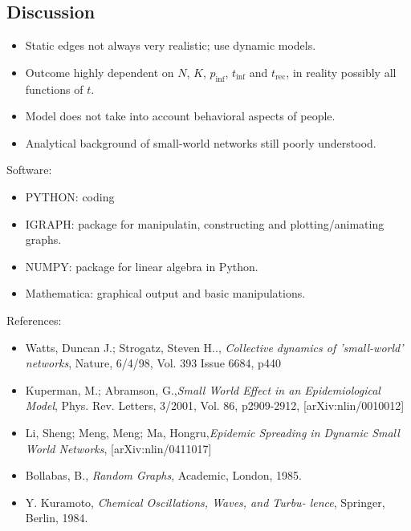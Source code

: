 \documentclass[blackandwhite]{beamer}
\begin{document}
\subsection{Discussion}

\begin{frame}
	\begin{itemize}
	\item
	Static edges not always very realistic; use dynamic models.
	\item
	Outcome highly dependent on $N$, $K$, $p_{\text{inf}}$, $t_{\text{inf}}$ and $t_{\text{rec}}$, in reality possibly all functions of $t$.
	\item
	Model does not take into account behavioral aspects of people.
	\item
	Analytical background of small-world networks still poorly understood.
	\end{itemize}
\end{frame}

\begin{frame}
  \tiny
  Software:
  \begin{itemize}
  \item
  PYTHON: coding
  \item
  IGRAPH: package for manipulatin, constructing and plotting/animating graphs.
  \item
  NUMPY: package for linear algebra in Python.
  \item
  Mathematica: graphical output and basic manipulations.
  \end{itemize}
  References:
  \begin{itemize}
  \item
  Watts, Duncan J.; Strogatz, Steven H.., \emph{Collective dynamics of 'small-world' networks}, Nature, 6/4/98, Vol. 393 Issue 6684, p440
  \item
  Kuperman, M.; Abramson, G.,\emph{Small World Effect in an Epidemiological Model}, Phys. Rev. Letters, 3/2001, Vol. 86, p2909-2912, [arXiv:nlin/0010012]
  \item
  Li, Sheng; Meng, Meng; Ma, Hongru,\emph{Epidemic Spreading in Dynamic Small World Networks}, [arXiv:nlin/0411017]
  \item
  Bollabas, B., \emph{Random Graphs}, Academic, London, 1985.
  \item
  Y. Kuramoto, \emph{Chemical Oscillations, Waves, and Turbu-
lence}, Springer, Berlin, 1984.
  \end{itemize}
\end{frame}
\end{document}
